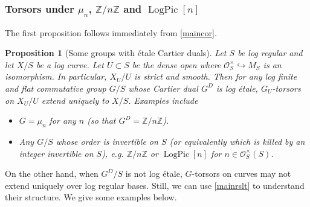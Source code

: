 \documentclass[a4paper,11pt]{amsart} %
\numberwithin{equation}{subsection}
\newcommand{\on}[1]{\operatorname{#1}}
\newcommand{\bb}[1]{{\mathbb{#1}}}
\newcommand{\ca}[1]{{\mathcal{#1}}}
\newcommand{\hra}{\hookrightarrow}
\theoremstyle{definition}
\theoremstyle{plain}%
\newtheorem{proposition}[definition]{Proposition}
\theoremstyle{remark}
\begin{document}
\subsubsection{Torsors under $\mu_n$, $\bb Z/n\bb Z$ and $\on{LogPic}[n]$}


 The first proposition follows immediately from  \ref{maincor}. 
\begin{proposition}[Some groups with \'etale Cartier duals]\label{ext_torsors}
   Let $S$ be log regular and let $X/S$ be a log curve. Let $U\subset S$ be the dense open where $\ca O_S^\times \hra M_S$ is an isomorphism. In particular, $X_U/U$ is strict and smooth. Then for any log finite and flat commutative group $G/S$ whose Cartier dual $G^D$ is log \'etale, $G_U$-torsors on $X_U/U$ extend uniquely to $X/S$. Examples include
   \begin{itemize}
       \item $G=\mu_n$ for any $n$ (so that $G^D=\bb Z/n\bb Z$).
       \item Any $G/S$ whose order is invertible on $S$ (or equivalently which is killed by an integer invertible on $S$), e.g. $\bb Z/n\bb Z$ or $\on{LogPic}[n]$ for $n\in \ca O_S^\times(S)$.
   \end{itemize}

\end{proposition}

On the other hand, when $G^D/S$ is not log \'etale, $G$-torsors on curves may not extend uniquely over log regular bases. Still, we can use \ref{mainrslt} to understand their structure. We give some examples below.
\end{document}
